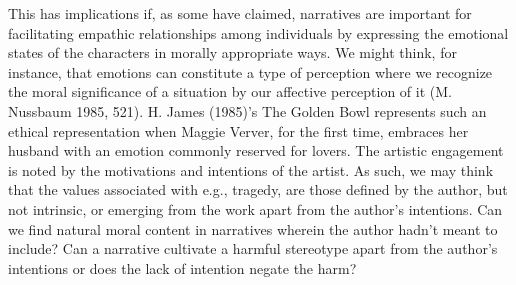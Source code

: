 \documentclass[12pt]{book}
\theoremstyle{definition}
\theoremstyle{remark}
\begin{document}
This has implications if, as some have claimed, narratives are important for facilitating empathic relationships among individuals by expressing the emotional states of the characters in morally appropriate ways. We might think, for instance, that emotions can constitute a type of perception where we recognize the moral significance of a situation by our affective perception of it (M. Nussbaum 1985, 521). H. James (1985)'s The Golden Bowl represents such an ethical representation when Maggie Verver, for the first time, embraces her husband with an emotion commonly reserved for lovers. The artistic engagement is noted by the motivations and intentions of the artist. As such, we may think that the values associated with e.g., tragedy, are those defined by the author, but not intrinsic, or emerging from the work apart from the author's intentions. Can we find natural moral content in narratives wherein the author hadn't meant to include? Can a narrative cultivate a harmful stereotype apart from the author's intentions or does the lack of intention negate the harm?
\end{document}
